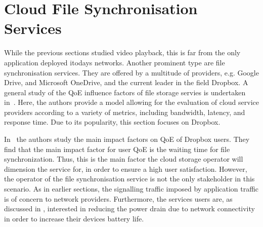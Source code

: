 \section{Cloud File Synchronisation Services}\label{sec:application:cloud_file_synchronisation}

\newcommand{\dropbox}{\emph{DropBox}\xspace}
\newcommand{\imageFileSize}{\ensuremath{S_I}\xspace}
\newcommand{\imageArrivalRate}{\ensuremath{\lambda_I}\xspace}
\newcommand{\panTransferRate}{\ensuremath{B_{P}}\xspace}
\newcommand{\interarrivaltime}{\ensuremath{t_I}\xspace}
\newcommand{\clientpreparationtime}{\ensuremath{C}\xspace}
\newcommand{\uploadbandwidth}{\ensuremath{B_U}\xspace}
\newcommand{\idleThreshold}{\ensuremath{\tau}\xspace}
\newcommand{\serverpreparationtime}{\ensuremath{S}\xspace}
\newcommand{\downloadbandwidth}{\ensuremath{B_D}\xspace}
\newcommand{\startupDelay}{\ensuremath{\sigma}\xspace}
\newcommand{\sojournTime}{\ensuremath{\Sigma}\xspace}
\newcommand{\relativeDisconnectedTime}{\ensuremath{\Delta}\xspace}
\newcommand{\connectionCount}{\ensuremath{K}\xspace}
\newcommand{\algointerval}{\emph{Interval}\xspace}
\newcommand{\algosize}{\emph{Size}\xspace}
\newcommand{\algoimmediate}{\emph{Immediate}\xspace}
\newcommand{\numberOfFiles}{\ensuremath{n}}

While the previous sections studied video playback, this is far from the only application deployed itodays networks.
Another prominent type are file synchronisation services.
They are offered by a multitude of providers, e.g. Google Drive, and Microsoft OneDrive, and the current leader in the field Dropbox.
A general study of the \gls{QoE} influence factors of file storage servies is undertaken in~\cite{Qian2011b}.
Here, the authors provide a model allowing for the evaluation of cloud service providers according to a variety of metrics, including bandwidth, latency, and response time.
Due to its popularity, this section focuses on Dropbox.

In~\cite{Amrehm2013} the authors study the main impact factors on \gls{QoE} of Dropbox users.
They find that the main impact factor for user \gls{QoE} is the waiting time for file synchronization.
Thus, this is the main factor the cloud storage operator will dimension the service for, in order to ensure a high user satisfaction. 
However, the operator of the file synchronisation service is not the only stakeholder in this scenario.
As in earlier sections, the signalling traffic imposed by application traffic is of concern to network providers.
Furthermore, the services users are, as discussed in , interested in reducing the power drain due to network connectivity in order to increase their devices battery life.

